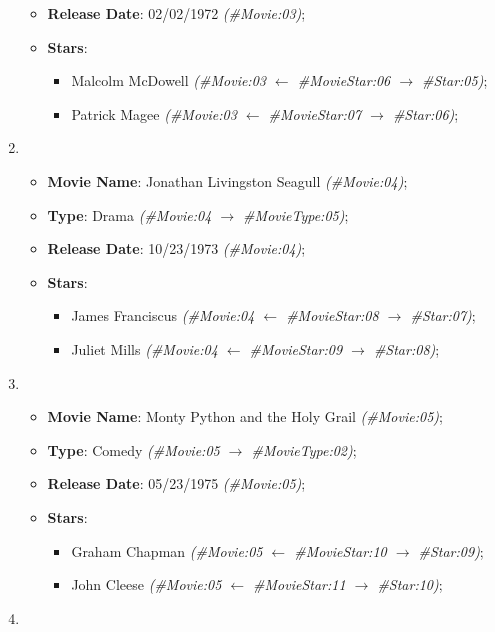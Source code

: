 \begin{enumerate}
{\begin{itemize}
					\item{\textbf{Release Date}: 02/02/1972 \textit{(\#Movie:03)};}
					\item{\textbf{Stars}:
						\begin{itemize}
							\item{Malcolm McDowell \textit{(\#Movie:03 $\gets$ \#MovieStar:06 $\to$ \#Star:05)};}
							\item{Patrick Magee \textit{(\#Movie:03 $\gets$ \#MovieStar:07 $\to$ \#Star:06)};}
						\end{itemize}}
				\end{itemize}}
			\item{%
				\begin{itemize}
					\item{\textbf{Movie Name}: Jonathan Livingston Seagull \textit{(\#Movie:04)};}
					\item{\textbf{Type}: Drama \textit{(\#Movie:04 $\to$ \#MovieType:05)};}
					\item{\textbf{Release Date}: 10/23/1973 \textit{(\#Movie:04)};}
					\item{\textbf{Stars}:
						\begin{itemize}
							\item{James Franciscus \textit{(\#Movie:04 $\gets$ \#MovieStar:08 $\to$ \#Star:07)};}
							\item{Juliet Mills \textit{(\#Movie:04 $\gets$ \#MovieStar:09 $\to$ \#Star:08)};}
						\end{itemize}}
				\end{itemize}}
			\item{%
				\begin{itemize}
					\item{\textbf{Movie Name}: Monty Python and the Holy Grail \textit{(\#Movie:05)};}
					\item{\textbf{Type}: Comedy \textit{(\#Movie:05 $\to$ \#MovieType:02)};}
					\item{\textbf{Release Date}: 05/23/1975 \textit{(\#Movie:05)};}
					\item{\textbf{Stars}:
						\begin{itemize}
							\item{Graham Chapman \textit{(\#Movie:05 $\gets$ \#MovieStar:10 $\to$ \#Star:09)};}
							\item{John Cleese \textit{(\#Movie:05 $\gets$ \#MovieStar:11 $\to$ \#Star:10)};}
						\end{itemize}}
				\end{itemize}}
			\item{%
}
\end{enumerate}
